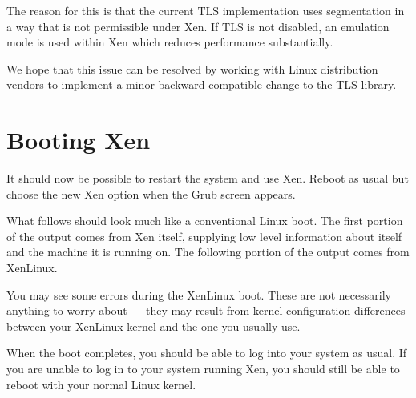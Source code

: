 The reason for this is that the current TLS implementation uses
segmentation in a way that is not permissible under Xen.  If TLS is
not disabled, an emulation mode is used within Xen which reduces
performance substantially.

We hope that this issue can be resolved by working with Linux
distribution vendors to implement a minor backward-compatible change
to the TLS library.


\section{Booting Xen}

It should now be possible to restart the system and use Xen.  Reboot
as usual but choose the new Xen option when the Grub screen appears.

What follows should look much like a conventional Linux boot.  The
first portion of the output comes from Xen itself, supplying low level
information about itself and the machine it is running on.  The
following portion of the output comes from XenLinux.

You may see some errors during the XenLinux boot.  These are not
necessarily anything to worry about --- they may result from kernel
configuration differences between your XenLinux kernel and the one you
usually use.

When the boot completes, you should be able to log into your system as
usual.  If you are unable to log in to your system running Xen, you
should still be able to reboot with your normal Linux kernel.
